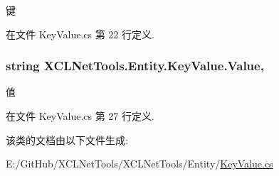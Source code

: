 键 



在文件 Key\+Value.\+cs 第 22 行定义.

\subsubsection[{\texorpdfstring{Value}{Value}}]{\setlength{\rightskip}{0pt plus 5cm}string X\+C\+L\+Net\+Tools.\+Entity.\+Key\+Value.\+Value\hspace{0.3cm}{\ttfamily [get]}, {\ttfamily [set]}}\hypertarget{class_x_c_l_net_tools_1_1_entity_1_1_key_value_a9ec3c76143930f64c1e0de2074514bae}{}\label{class_x_c_l_net_tools_1_1_entity_1_1_key_value_a9ec3c76143930f64c1e0de2074514bae}


值 



在文件 Key\+Value.\+cs 第 27 行定义.



该类的文档由以下文件生成\+:\begin{DoxyCompactItemize}
\item 
E\+:/\+Git\+Hub/\+X\+C\+L\+Net\+Tools/\+X\+C\+L\+Net\+Tools/\+Entity/\hyperlink{_key_value_8cs}{Key\+Value.\+cs}\end{DoxyCompactItemize}
